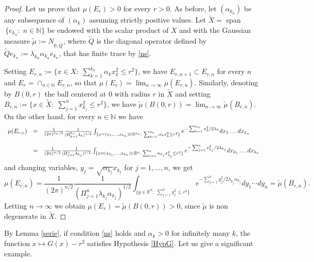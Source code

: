 \documentclass[reqno,twoside,12pt]{amsart}
\begin{document}
\begin{proof}
\vspace{1mm}
Let us prove that $\mu(E_r)>0$ for every $r>0$. 
As before, let  $(\alpha_{k_n})$ be any subsequence  of  $(\alpha_k)$ assuming strictly positive values. 
Let $\widetilde{X} =$ span$\,\{e_{k_n}:\; n\in {\mathbb N}\}$ be endowed with the scalar product of $X$ and with the Gaussian measure $\widetilde{\mu} :=N_{0,\widetilde{Q}}$, where $\widetilde{Q}$ is the diagonal operator defined by
$\widetilde{Q}e_{k_n} := \lambda_{k_n} \alpha_{k_n} e_{k_n}$, that has finite trace by \eqref{ns}.  

Setting $E_{r,n}:= \{ x\in X:\; \sum_{k=1}^{k_n} \alpha_kx_k^2 \leq r^2\}$, we have $E_{r,n+1}\subset E_{r,n}$ for every $n$ and $E_{r} = \cap_{n\in {\mathbb N}} E_{r,n}$, so that $\mu(E_r) = \lim_{n\to \infty} \mu( E_{r,n})$. Similarly, denoting by $B(0,r)$ the ball centered at $0$ with radius $r$ in $\widetilde{X}$ and
setting $B_{r,n}:= \{ x\in \widetilde{X}:\; \sum_{j=1} ^n x_{k_j}^2 \leq r^2\}$,
we have $ \widetilde{\mu}(B(0,r)) = \lim_{n\to \infty} \widetilde{\mu}( B_{r,n})$. 
On the other hand, for every $n\in {\mathbb N}$ we have
$$\begin{array}{lll}
\mu (E_{r,n}) & = & {\displaystyle} \frac{1}{(2\pi)^{k_n/2}} \frac{1}{(\Pi_{k=1}^{k_n} \lambda_k)^{1/2}}
\int_{\{x=(x_1, \ldots, x_{k_n})\in {\mathbb R}^{k_n}:\; \sum_{k=1}^{k_n} \alpha_k x_k^2 \leq r^2 \}} e^{-\sum_{k=1}^{k_n}x_k^2/2\lambda_k}dx_{1}\ldots dx_{k_n}
\\
\\
& = & {\displaystyle} \frac{1}{(2\pi)^{n/2}} \frac{1}{(\Pi_{j=1}^n \lambda_{k_j} )^{1/2}}
\int_{\{ x=(x_{k_1}, \ldots, x_{k_n}) \in {\mathbb R}^n: \; \sum_{j=1}^{n} \alpha_{k_j} x_{k_j}^2 \leq r^2 \}} 
 e^{-\sum_{j=1}^nx_{k_j}^2/2\lambda_{k_j}}dx_{k_1}\ldots dx_{k_n}
\end{array}$$
and changing variables, $y_j = \sqrt{\alpha_{k_j}}x_{k_j}$ for $j=1, \ldots, n$, we get 
$$\mu (E_{r,n})   = \frac{1}{(2\pi)^{n/2}} \frac{1}{(\Pi_{j=1}^n \lambda_{k_j}\alpha_{k_j})^{1/2}}
\int_{\{ y\in {\mathbb R}^n: \; \sum_{j=1}^{n} y_{j}^2 \leq r^2 \}} 
 e^{-\sum_{j=1}^ny_{j}^2/2\lambda_{k_j}\alpha_{k_j}}dy_{1}\cdots dy_{n}
 = \widetilde{\mu}( B_{r,n}).$$
 Letting $n\to \infty$ we obtain $\mu(E_r) =  \widetilde{\mu}(B(0,r)) >0$, since $\widetilde{\mu}$ is non degenerate in $ \widetilde{X}$. 
\end{proof}

By Lemma \ref{serie}, if condition \eqref{ns} holds and $\alpha_k > 0$ for infinitely many $k$, the function $x\mapsto G(x) - r^2$ satisfies Hypothesis \ref{HypG}. Let us give a significant example. 
\end{document}
